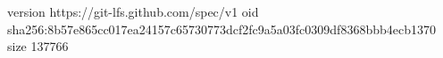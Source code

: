 version https://git-lfs.github.com/spec/v1
oid sha256:8b57e865cc017ea24157c65730773dcf2fc9a5a03fc0309df8368bbb4ecb1370
size 137766
